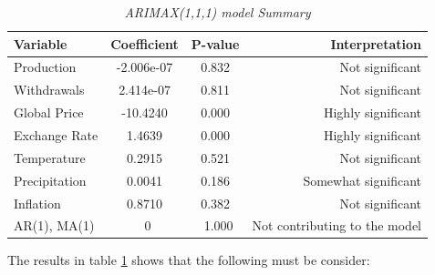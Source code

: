 \documentclass[11pt]{article}
\begin{document}
\begin{table}[H]
    \caption{\textit{ARIMAX(1,1,1) model Summary}}
    \label{signficance}
    \centering
    \begin{tabular}{lccr}
        \toprule
        Variable & Coefficient & P-value & Interpretation \\
        \midrule
        Production  & -2.006e-07 &  0.832  &  Not significant \\
        Withdrawals & 2.414e-07 &  0.811  &  Not significant  \\
       Global Price  & -10.4240   &  0.000  &  Highly significant \\ 
        Exchange Rate&  1.4639    &  0.000  &  Highly significant\\ 
        Temperature   &  0.2915    &  0.521  &  Not significant\\ 
        Precipitation &  0.0041    &  0.186  &  Somewhat significant \\
         Inflation &  0.8710    &  0.382  &  Not significant \\ 
        AR(1), MA(1)   &   ~0       & ~1.000  &  Not contributing to the model \\
        \bottomrule
    \end{tabular}
\end{table}

\newpage

\noindent The results in table \ref{signficance} shows that the following must be consider:
\end{document}
